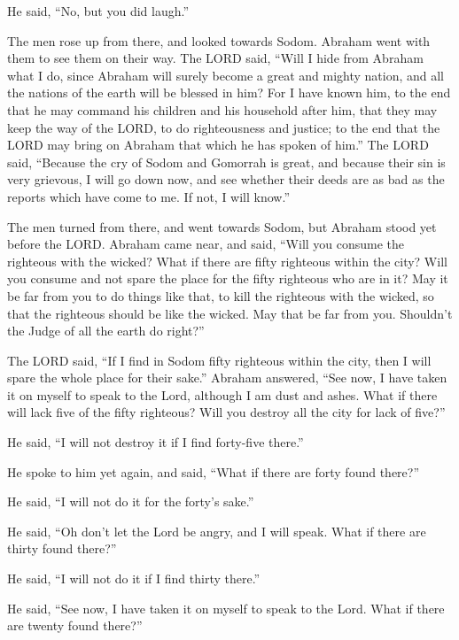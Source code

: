 He said, ``No, but you did laugh.''

 The men rose up from there, and looked towards Sodom.
Abraham went with them to see them on their way.  The
LORD said, ``Will I hide from Abraham what I do,  since
Abraham will surely become a great and mighty nation, and all the
nations of the earth will be blessed in him?  For I have
known him, to the end that he may command his children and his household
after him, that they may keep the way of the LORD, to do righteousness
and justice; to the end that the LORD may bring on Abraham that which he
has spoken of him.''  The LORD said, ``Because the cry of
Sodom and Gomorrah is great, and because their sin is very grievous,
 I will go down now, and see whether their deeds are as
bad as the reports which have come to me. If not, I will know.''

 The men turned from there, and went towards Sodom, but
Abraham stood yet before the LORD.  Abraham came near,
and said, ``Will you consume the righteous with the wicked?
 What if there are fifty righteous within the city? Will
you consume and not spare the place for the fifty righteous who are in
it?  May it be far from you to do things like that, to
kill the righteous with the wicked, so that the righteous should be like
the wicked. May that be far from you. Shouldn't the Judge of all the
earth do right?''

 The LORD said, ``If I find in Sodom fifty righteous
within the city, then I will spare the whole place for their sake.''
 Abraham answered, ``See now, I have taken it on myself
to speak to the Lord, although I am dust and ashes.  What
if there will lack five of the fifty righteous? Will you destroy all the
city for lack of five?''

He said, ``I will not destroy it if I find forty-five there.''

 He spoke to him yet again, and said, ``What if there are
forty found there?''

He said, ``I will not do it for the forty's sake.''

 He said, ``Oh don't let the Lord be angry, and I will
speak. What if there are thirty found there?''

He said, ``I will not do it if I find thirty there.''

 He said, ``See now, I have taken it on myself to speak
to the Lord. What if there are twenty found there?''

